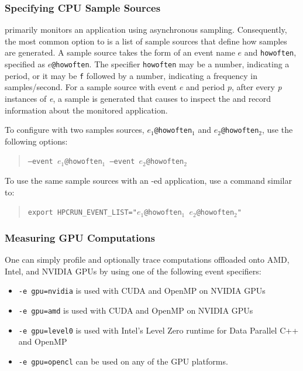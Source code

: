 \documentclass[11pt,twoside,letterpaper]{report}
\begin{document}
\subsubsection{Specifying CPU Sample Sources}

\HPCToolkit{} primarily monitors an application using asynchronous sampling.
Consequently, the most common option to \hpcrun{} is a list of sample sources that define how samples are generated.
A sample source takes the form of an event name $e$ and \texttt{howoften}, specified as \texttt{$e$@howoften}. The specifier \texttt{howoften} may
be a number, indicating a period, \eg{}  or it may be \texttt{f} followed by a number,  indicating a frequency in samples/second.
For a sample source with event $e$ and period $p$, after every \emph{p} instances of \emph{e}, a sample is generated that causes \hpcrun{} to inspect the and record information about the monitored application.

To configure \hpcrun{} with two samples sources, \texttt{$e_1$@howoften$_1$} and \texttt{$e_2$@howoften$_2$}, use the following options:
\begin{quote}
  \texttt{--event $e_1$@howoften$_1$ --event $e_2$@howoften$_2$}
\end{quote}
To use the same sample sources with an \hpclink{}-ed application, use a command similar to:
\begin{quote}
  \texttt{export HPCRUN\_EVENT\_LIST="$e_1$@howoften$_1$ $e_2$@howoften$_2$"}
\end{quote}

\subsubsection{Measuring GPU Computations}

One can simply profile and optionally trace computations offloaded onto AMD, Intel, and NVIDIA GPUs by using one of the following event specifiers:
\begin{itemize}
\item  {\tt -e gpu=nvidia}  is used with CUDA and OpenMP on NVIDIA GPUs
\item  {\tt -e gpu=amd}  is used with CUDA and OpenMP on NVIDIA GPUs
\item  {\tt -e gpu=level0}  is used with Intel's Level Zero runtime for Data Parallel C++ and OpenMP
\item  {\tt -e gpu=opencl}  can be used on any of the GPU platforms.
\end{itemize}
\end{document}
